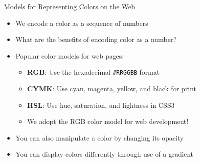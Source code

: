 \documentclass[14pt,aspectratio=169]{beamer}
\begin{document}
%
\begin{frame}{Models for Representing Colors on the Web}
  \begin{itemize}
    \item We encode a color as a sequence of numbers
      \vspace*{-.2in}
    \item What are the benefits of encoding color as a number?
      \vspace*{-.2in}
    \item Popular color models for web pages:
      \begin{itemize}
        \item {\bf RGB}: Use the hexadecimal {\tt \#RRGGBB} format
        \item {\bf CYMK}: Use cyan, magenta, yellow, and black for print
        \item {\bf HSL}: Use hue, saturation, and lightness in CSS3
        \item We adopt the RGB color model for web development!
      \end{itemize}
      \vspace*{-.25in}
    \item You can also manipulate a color by changing its opacity
      \vspace*{-.25in}
    \item You can display colors differently through use of a gradient
  \end{itemize}
\end{frame}
\end{document}
